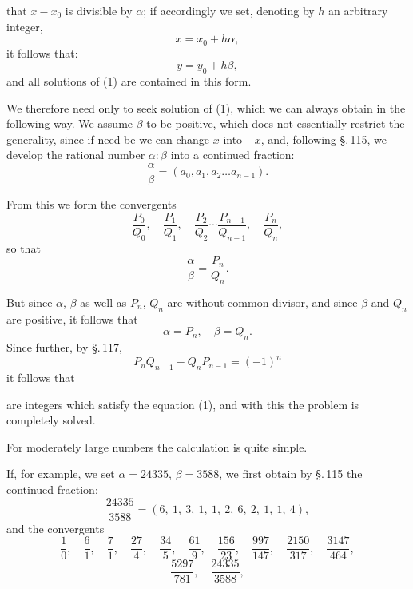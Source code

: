 that $x - x_0$ is divisible by $\alpha$; if accordingly we set, denoting by $h$ an arbitrary integer,
\[
x = x_0 + h \alpha,
\]
it follows that:
\[
y = y_0 + h \beta,
\]
and all solutions of (1) are contained in this form.

We therefore need only to seek  solution of (1), which we can always obtain in the following way. We assume $\beta$ to be positive, which does not essentially restrict the generality, since if need be we can change $x$ into $-x$, and, following \S.\,115, we develop the rational number $\alpha : \beta$ into a continued fraction:
\[
\frac{\alpha}{\beta} = (a_0, a_1, a_2 \ldots a_{n-1}).
\]

From this we form the convergents
\[
\frac{P_0}{Q_0}, \quad \frac{P_1}{Q_1}, \quad \frac{P_2}{Q_2} \cdots \frac{P_{n-1}}{Q_{n-1}}, \quad \frac{P_n}{Q_n},
\]
so that
\[
\frac{\alpha}{\beta} = \frac{P_n}{Q_n}.
\]

But since $\alpha$, $\beta$ as well as $P_n$, $Q_n$ are without common divisor, and since $\beta$ and $Q_n$ are positive, it follows that
\[
\alpha = P_n, \quad \beta = Q_n.
\]
Since further, by \S.\,117,
\[
P_n Q_{n-1} - Q_n P_{n-1} = (-1)^n
\]
it follows that

are integers which satisfy the equation (1), and with this the problem is completely solved.

For moderately large numbers the calculation is quite simple.

If, for example, we set $\alpha = 24335$, $\beta = 3588$, we first obtain by \S.\,115 the continued fraction:
\[
\frac{24335}{3588} = (6,\ 1,\ 3,\ 1,\ 1,\ 2,\ 6,\ 2,\ 1,\ 1,\ 4),
\]
and the convergents
\[
\frac{1}{0}, \quad \frac{6}{1}, \quad \frac{7}{1}, \quad \frac{27}{4}, \quad \frac{34}{5}, \quad \frac{61}{9}, \quad \frac{156}{23}, \quad \frac{997}{147}, \quad \frac{2150}{317}, \quad \frac{3147}{464},
\]
\[
\frac{5297}{781}, \quad \frac{24335}{3588},
\]
